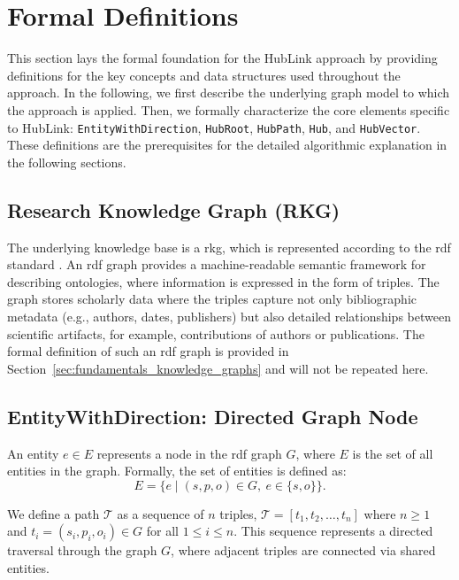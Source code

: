 
\section{Formal Definitions}
\label{sec:hublink_formal_definitions}

This section lays the formal foundation for the HubLink approach by providing definitions for the key concepts and data structures used throughout the approach. In the following, we first describe the underlying graph model to which the approach is applied. Then, we formally characterize the core elements specific to HubLink: \texttt{EntityWithDirection}, \texttt{HubRoot}, \texttt{HubPath}, \texttt{Hub}, and \texttt{HubVector}. These definitions are the prerequisites for the detailed algorithmic explanation in the following sections.

\subsection{Research Knowledge Graph (RKG)}

The underlying knowledge base is a \acrfull{rkg}, which is represented according to the \gls{rdf} standard \cite{wood_rdf_2014}. An \gls{rdf} graph provides a machine-readable semantic framework for describing ontologies, where information is expressed in the form of triples. The graph stores scholarly data where the triples capture not only bibliographic metadata (e.g., authors, dates, publishers) but also detailed relationships between scientific artifacts, for example, contributions of authors or publications. The formal definition of such an \gls{rdf} graph is provided in Section~\ref{sec:fundamentals_knowledge_graphs} and will not be repeated here.


\subsection{EntityWithDirection: Directed Graph Node}

An entity \( e \in E \) represents a node in the \gls{rdf} graph \( G \), where \( E \) is the set of all entities in the graph. Formally, the set of entities is defined as:
\[
E = \{ e \mid (s, p, o) \in G,\ e \in \{s, o\} \}.
\]

We define a path \( \mathcal{T} \) as a sequence of \( n \) triples, \( \mathcal{T} = [t_1, t_2, \ldots, t_n] \) where \( n \ge 1 \) and \( t_i = (s_i, p_i, o_i) \in G \) for all \( 1 \le i \le n \). This sequence represents a directed traversal through the graph \( G \), where adjacent triples are connected via shared entities.

